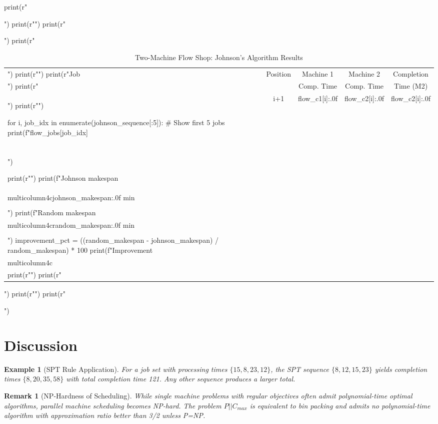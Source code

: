 \documentclass[a4paper, 11pt]{article}
\newtheorem{example}{Example}[section]
\newtheorem{remark}{Remark}[section]
\begin{document}
\begin{pycode}
print(r"\begin{table}[htbp]")
print(r"\centering")
print(r"\caption{Two-Machine Flow Shop: Johnson's Algorithm Results}")
print(r"\begin{tabular}{lcccc}")
print(r"\toprule")
print(r"Job & Position & Machine 1 & Machine 2 & Completion \\")
print(r"    &          & Comp. Time & Comp. Time & Time (M2) \\")
print(r"\midrule")

for i, job_idx in enumerate(johnson_sequence[:5]):  # Show first 5 jobs
    print(f"{flow_jobs[job_idx]} & {i+1} & {flow_c1[i]:.0f} & {flow_c2[i]:.0f} & {flow_c2[i]:.0f} \\\\")

print(r"\midrule")
print(f"Johnson makespan & \\multicolumn{{4}}{{c}}{{{johnson_makespan:.0f} min}} \\\\")
print(f"Random makespan & \\multicolumn{{4}}{{c}}{{{random_makespan:.0f} min}} \\\\")
improvement_pct = ((random_makespan - johnson_makespan) / random_makespan) * 100
print(f"Improvement & \\multicolumn{{4}}{{c}}{{{improvement_pct:.1f}\\%

print(r"\bottomrule")
print(r"\end{tabular}")
print(r"\label{tab:flowshop}")
print(r"\end{table}")
\end{pycode}

\section{Discussion}

\begin{example}[SPT Rule Application]
For a job set with processing times $\{15, 8, 23, 12\}$, the SPT sequence $\{8, 12, 15, 23\}$
yields completion times $\{8, 20, 35, 58\}$ with total completion time 121. Any other sequence
produces a larger total.
\end{example}

\begin{remark}[NP-Hardness of Scheduling]
While single machine problems with regular objectives often admit polynomial-time optimal algorithms,
parallel machine scheduling becomes NP-hard. The problem $P||C_{max}$ is equivalent to bin packing
and admits no polynomial-time algorithm with approximation ratio better than 3/2 unless P=NP.
\end{remark}
\end{document}
